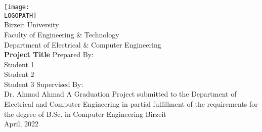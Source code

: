\documentclass[12pt,a4paper]{report}
\def \LOGOPATH {assets/birzeit-logo.png}
\def \UNIVERSITY {Birzeit University}
\def \FACULTY {Faculty of Engineering \& Technology}
\def \DEPARTEMENT {Department of Electrical \& Computer Engineering}
\def \PROJECTTITLE {Project Title}
\def \STUDENTA {Student 1}
\def \STUDENTB {Student 2}
\def \STUDENTC {Student 3}
\def \SUPERVISOR {Dr. Ahmad Ahmad}
\begin{document}
\setlength{\parindent}{0em}
\setlength{\parskip}{0.5em}


\begin{titlepage}
    \vfill
    \begin{center}
        \texttt{[image: \\LOGOPATH]} \\
        \fontsize{14pt}{14pt}\selectfont
        \vfill
        \UNIVERSITY \\
        \FACULTY \\
        \DEPARTEMENT \\
        \vfill
        \fontsize{17.28pt}{17.28pt}\selectfont
        \textbf{\PROJECTTITLE}
        \vfill
        \fontsize{14pt}{14pt}\selectfont
        Prepared By: \\
        \STUDENTA \\
        \STUDENTB \\
        \STUDENTC
        \vfill
        Supervised By: \\
        \SUPERVISOR
        \vfill
        A Graduation Project submitted to the Department of Electrical and Computer Engineering in partial fulfillment of the requirements for the degree of B.Sc. in Computer Engineering
        \vfill
        Birzeit \\
        April, 2022
    \end{center}
\end{titlepage}

\dominitoc



\cleardoublepage {} {} \mtcaddchapter \tableofcontents

\cleardoublepage {} {} \mtcaddchapter \listoftables

\cleardoublepage {} {} \mtcaddchapter \listoffigures

\cleardoublepage

\setlength{\parindent}{0em}
\setlength{\parskip}{0.5em}














\cleardoublepage {} {} \mtcaddchapter


\end{document}
